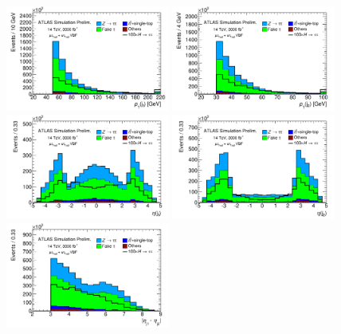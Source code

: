 \begin{figure}[tp]
  \centering
  \includegraphics[width=0.48\textwidth]{figures/ATL-PHYS-PUB-2014-018/fig_03a}
  \includegraphics[width=0.48\textwidth]{figures/ATL-PHYS-PUB-2014-018/fig_03b}
  \includegraphics[width=0.48\textwidth]{figures/ATL-PHYS-PUB-2014-018/fig_03c}
  \includegraphics[width=0.48\textwidth]{figures/ATL-PHYS-PUB-2014-018/fig_03d}
  \includegraphics[width=0.48\textwidth]{figures/ATL-PHYS-PUB-2014-018/fig_03e}

\end{figure}
